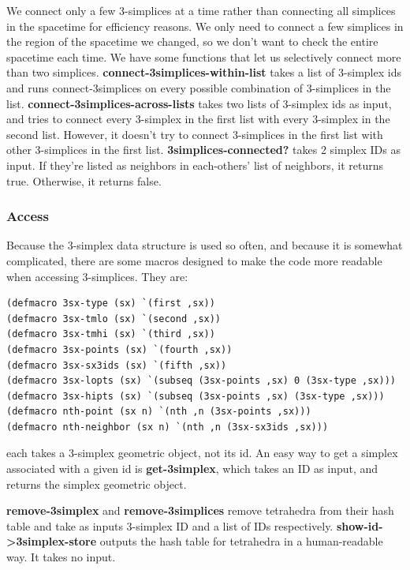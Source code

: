 \message{ !name(programmers_guide.tex)}\documentclass[12pt]{article}
\begin{document}
We connect only a few 3-simplices at a time rather than connecting all
simplices in the spacetime for efficiency reasons. We only need to
connect a few simplices in the region of the spacetime we changed, so
we don't want to check the entire spacetime each time. We have some
functions that let us selectively connect more than two
simplices. \textbf{connect-3simplices-within-list} takes a list of
3-simplex ids and runs connect-3simplices on every possible
combination of 3-simplices in the
list. \textbf{connect-3simplices-across-lists} takes two lists of
3-simplex ids as input, and tries to connect every 3-simplex in the
first list with every 3-simplex in the second list. However, it
doesn't try to connect 3-simplices in the first list with other
3-simplices in the first list. \textbf{3simplices-connected?} takes 2
simplex IDs as input. If they're listed as neighbors in each-others'
list of neighbors, it returns true. Otherwise, it returns false.

\subsubsection{Access}
\label{s:d:tetrahedra:access}
Because the 3-simplex data structure is used so often, and because it
is somewhat complicated, there are some macros designed to make the
code more readable when accessing 3-simplices. They are:
\begin{small}
\begin{lstlisting}
(defmacro 3sx-type (sx) `(first ,sx))
(defmacro 3sx-tmlo (sx) `(second ,sx))
(defmacro 3sx-tmhi (sx) `(third ,sx))
(defmacro 3sx-points (sx) `(fourth ,sx))
(defmacro 3sx-sx3ids (sx) `(fifth ,sx))
(defmacro 3sx-lopts (sx) `(subseq (3sx-points ,sx) 0 (3sx-type ,sx)))
(defmacro 3sx-hipts (sx) `(subseq (3sx-points ,sx) (3sx-type ,sx)))
(defmacro nth-point (sx n) `(nth ,n (3sx-points ,sx)))
(defmacro nth-neighbor (sx n) `(nth ,n (3sx-sx3ids ,sx)))
\end{lstlisting}
\end{small}
each takes a 3-simplex geometric object, not its id. An easy way to
get a simplex associated with a given id is \textbf{get-3simplex},
which takes an ID as input, and returns the simplex geometric
object. 

\textbf{remove-3simplex} and \textbf{remove-3simplices} remove
tetrahedra from their hash table and take as inputs 3-simplex ID and a
list of IDs respectively. \textbf{show-id->3simplex-store} outputs the
hash table for tetrahedra in a human-readable way. It takes no input. 
\end{document}

